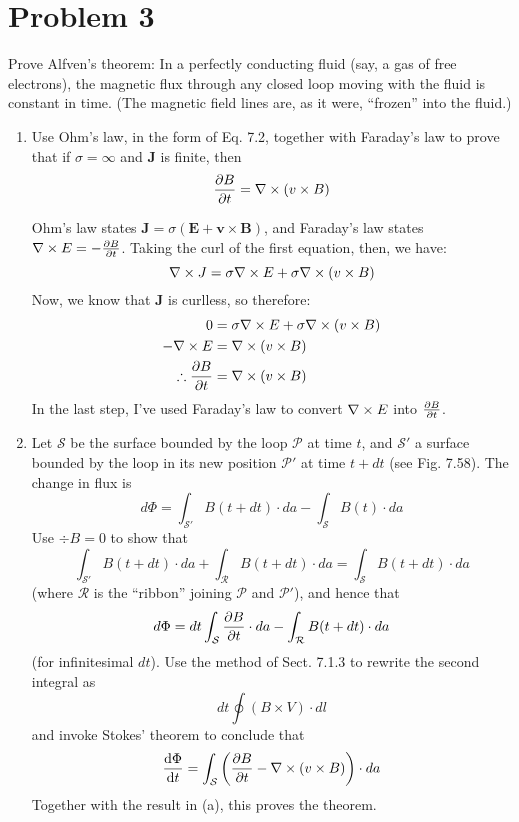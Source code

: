 \documentclass[10pt]{article}
\begin{document}
	\section*{Problem 3}
	Prove Alfven's theorem: In a perfectly conducting fluid (say, a gas of free electrons), the magnetic
	flux through any closed loop moving with the fluid is constant in time. (The magnetic field lines are, 
	as it were, ``frozen'' into the fluid.)

	\begin{enumerate}[label=\alph*)]
		\item Use Ohm's law, in the form of Eq. 7.2, together with Faraday's law to prove that if $\sigma = 
			\infty$ and $\mathbf J$ is finite, then
			\[
				\pdv{B}{t} = \nabla \times(v \times B)
			\] 

			\begin{solution}
				Ohm's law states $\mathbf J = \sigma (\mathbf E + \mathbf v \times \mathbf B)$, and Faraday's
				law states $\nabla \times E = -\pdv{B}{t}$. Taking the curl of the first equation, then, we have: 
				\[
					\nabla \times J = \sigma \nabla \times E + \sigma \nabla \times (v \times B)
				\] 
				Now, we know that $\mathbf J$ is curlless, so therefore: 
				\begin{align*}
					0 &= \sigma \nabla \times E + \sigma \nabla \times (v \times B)\\
					 - \nabla \times E &= \nabla \times (v \times B)\\
					 \therefore \pdv{B}{t} &= \nabla \times (v \times B)
				\end{align*}		
				In the last step, I've used Faraday's law to convert $\nabla \times E$ into $\pdv{B}{t}$.
			\end{solution}
			\pagebreak
		\item Let $\mathcal S$ be the surface bounded by the loop $\mathcal P$ at time $t$, and $\mathcal S'$ 
			a surface bounded by the loop in its new position $\mathcal P'$ at time $t + dt$ (see Fig. 7.58).
			The change in flux is 
			\[
				d\Phi = \int_{\mathcal S'} B(t + dt) \cdot da - \int_{\mathcal S} B(t) \cdot da
			\] 
			Use $\div B = 0$ to show that
			\[
				\int_{\mathcal S'} B(t + dt) \cdot da + \int_{\mathcal R} B(t + dt) \cdot da = \int_{\mathcal S}
				B(t + dt) \cdot da
			\] 
			(where $\mathcal R$ is the ``ribbon'' joining $\mathcal P$ and $\mathcal P'$), and hence that
			\[
				d\Phi = dt \int_{\mathcal S} \pdv{B}{t} \cdot da - \int_{\mathcal R} B(t + dt) \cdot da
			\] 
			(for infinitesimal $dt$). Use the method of Sect. 7.1.3 to rewrite the second integral as
			\[
			dt \oint (B \times V) \cdot dl
			\] 
			and invoke Stokes' theorem to conclude that
			\[
				\dv{\Phi}{t} = \int_{\mathcal S}\left( \pdv{B}{t} - \nabla \times(v \times B)\right) \cdot da
			\] 
			Together with the result in (a), this proves the theorem. 
			

\end{enumerate}
\end{document}
